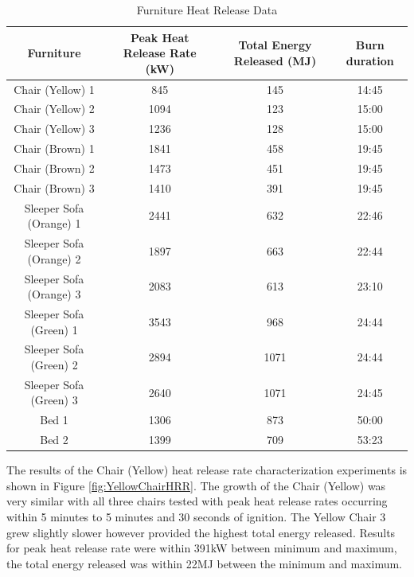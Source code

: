 \documentclass{article}
\begin{document}
\begin{table}[H]
	\caption{Furniture Heat Release Data}
	\begin{tabular}{|c|c|c|c|}
		\hline
		Furniture & Peak Heat Release Rate (kW) & Total Energy Released (MJ) & Burn duration \\ \hline \hline
		Chair (Yellow) 1 & 845 & 145 & 14:45 \\ \hline
		Chair (Yellow) 2 & 1094 & 123 & 15:00 \\ \hline
		Chair (Yellow) 3 & 1236 & 128 & 15:00 \\ \hline
		Chair (Brown) 1 & 1841 & 458 & 19:45 \\ \hline
		Chair (Brown) 2 & 1473 & 451 & 19:45 \\ \hline
		Chair (Brown) 3 & 1410 & 391 & 19:45 \\ \hline
		Sleeper Sofa (Orange) 1  & 2441 & 632 & 22:46 \\ \hline
		Sleeper Sofa (Orange) 2  & 1897 & 663 & 22:44 \\ \hline
		Sleeper Sofa (Orange) 3  & 2083 & 613 & 23:10 \\ \hline
		Sleeper Sofa (Green) 1  & 3543 & 968 & 24:44 \\ \hline
		Sleeper Sofa (Green) 2  & 2894 & 1071 & 24:44 \\ \hline
		Sleeper Sofa (Green) 3  & 2640 & 1071 & 24:45 \\ \hline
		Bed 1 & 1306 & 873 & 50:00 \\ \hline
		Bed 2 & 1399 & 709 & 53:23 \\ \hline
	\end{tabular}
	\label{table:FurnitureHRR_Data}
\end{table}

\clearpage

The results of the Chair (Yellow) heat release rate characterization experiments is shown in Figure \ref{fig:YellowChairHRR}. The growth of the Chair (Yellow) was very similar with all three chairs tested with peak heat release rates occurring within 5 minutes to 5 minutes and 30 seconds of ignition. The Yellow Chair 3 grew slightly slower however provided the highest total energy released. Results for peak heat release rate were within 391kW between minimum and maximum, the total energy released was within 22MJ between the minimum and maximum. 
\end{document}
